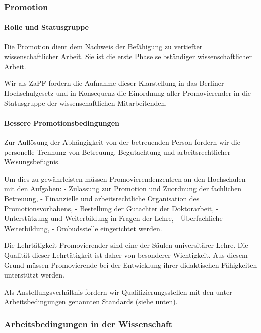 \hypertarget{promotion}{%
\subsubsection{Promotion}\label{promotion}}

\hypertarget{rolle-und-statusgruppe}{%
\paragraph{Rolle und Statusgruppe}\label{rolle-und-statusgruppe}}

Die Promotion dient dem Nachweis der Befähigung zu vertiefter
wissenschaftlicher Arbeit. Sie ist die erste Phase selbständiger
wissenschaftlicher Arbeit.

Wir als ZaPF fordern die Aufnahme dieser Klarstellung in das Berliner
Hochschulgesetz und in Konsequenz die Einordnung aller Promovierender in
die Statusgruppe der wissenschaftlichen Mitarbeitenden.

\hypertarget{bessere-promotionsbedingungen}{%
\paragraph{Bessere
Promotionsbedingungen}\label{bessere-promotionsbedingungen}}

Zur Auflösung der Abhängigkeit von der betreuenden Person fordern wir
die personelle Trennung von Betreuung, Begutachtung und
arbeitsrechtlicher Weisungsbefugnis.

Um dies zu gewährleisten müssen Promovierendenzentren an den Hochschulen
mit den Aufgaben: - Zulassung zur Promotion und Zuordnung der fachlichen
Betreuung, - Finanzielle und arbeitsrechtliche Organisation des
Promotionsvorhabens, - Bestellung der Gutachter der Doktorarbeit, -
Unterstützung und Weiterbildung in Fragen der Lehre, - Überfachliche
Weiterbildung, - Ombudsstelle eingerichtet werden.

Die Lehrtätigkeit Promovierender sind eine der Säulen universitärer
Lehre. Die Qualität dieser Lehrtätigkeit ist daher von besonderer
Wichtigkeit. Aus diesem Grund müssen Promovierende bei der Entwicklung
ihrer didaktischen Fähigkeiten unterstützt werden.

Als Anstellungsverhältnis fordern wir Qualifizierungsstellen mit den
unter Arbeitsbedingungen genannten Standards (siehe
\href{https://protokolle.zapf.in/reso_BerlHG\#Qualifizierungsstellen}{unten}).

\hypertarget{arbeitsbedingungen-in-der-wissenschaft}{%
\subsubsection{Arbeitsbedingungen in der
Wissenschaft}\label{arbeitsbedingungen-in-der-wissenschaft}}

